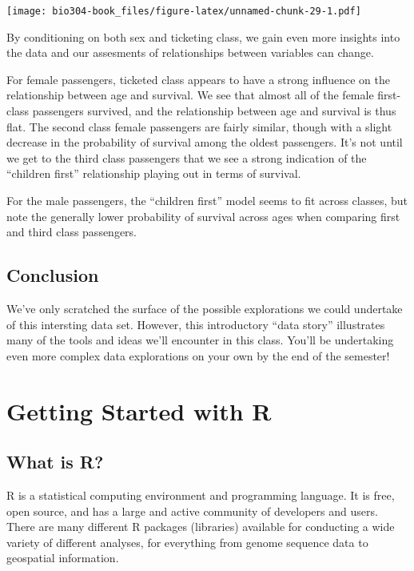 \documentclass[]{book}
\theoremstyle{definition}
\theoremstyle{definition}
\theoremstyle{definition}
\theoremstyle{remark}
\begin{document}
\texttt{[image: bio304-book\_files/figure-latex/unnamed-chunk-29-1.pdf]}

By conditioning on both sex and ticketing class, we gain even more
insights into the data and our assesments of relationships between
variables can change.

For female passengers, ticketed class appears to have a strong influence
on the relationship between age and survival. We see that almost all of
the female first-class passengers survived, and the relationship between
age and survival is thus flat. The second class female passengers are
fairly similar, though with a slight decrease in the probability of
survival among the oldest passengers. It's not until we get to the third
class passengers that we see a strong indication of the ``children
first'' relationship playing out in terms of survival.

For the male passengers, the ``children first'' model seems to fit
across classes, but note the generally lower probability of survival
across ages when comparing first and third class passengers.

\hypertarget{conclusion}{%
\section{Conclusion}\label{conclusion}}

We've only scratched the surface of the possible explorations we could
undertake of this intersting data set. However, this introductory ``data
story'' illustrates many of the tools and ideas we'll encounter in this
class. You'll be undertaking even more complex data explorations on your
own by the end of the semester!

\hypertarget{getting-started-with-r}{%
\chapter{Getting Started with R}\label{getting-started-with-r}}

\hypertarget{what-is-r}{%
\section{What is R?}\label{what-is-r}}

R is a statistical computing environment and programming language. It is
free, open source, and has a large and active community of developers
and users. There are many different R packages (libraries) available for
conducting a wide variety of different analyses, for everything from
genome sequence data to geospatial information.
\end{document}
